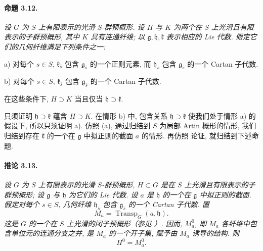 

\paragraph{\textbf{命题 3.12.}}
{\itshape 设 \(G\) 为 \(S\) 上有限表示的光滑 \(S\)-群预概形. 设 \(H\) 与 \(K\) 为两个在 \(S\) 上光滑且有限表示的子群预概形, 其中 \(K\) 具有连通纤维; 以 \(\mathfrak g,\mathfrak h,\mathfrak k\) 表示相应的 Lie 代数. 假定它们的几何纤维满足下列条件之一:

\smallskip
\noindent
\textup{a)}
对每个 \(s\in S\), \(\mathfrak k_{\bar s}\) 包含 \(\mathfrak g_{\bar s}\) 的一个正则元素, 而 \(\mathfrak h_{\bar s}\) 包含 \(\mathfrak g_{\bar s}\) 的一个 Cartan 子代数.

\smallskip
\noindent
\textup{b)}
对每个 \(s\in S\), \(\mathfrak k_{\bar s}\) 包含 \(\mathfrak g_{\bar s}\) 的一个 Cartan 子代数.

\smallskip
\noindent
在这些条件下, \(H\supset K\) 当且仅当 \(\mathfrak h\supset\mathfrak k\).}

只须证明 \(\mathfrak h\supset\mathfrak k\) 蕴含 \(H\supset K\). 在情形 b) 中, 包含关系 \(\mathfrak h\supset\mathfrak k\) 使我们处于情形 a) 的假设下, 所以只须证明 a). 仿照 \textup{(a)}, 通过归结到 \(S\) 为局部 Artin 概形的情形, 我们归结到存在 \(\mathfrak k\) 的一个在 \(\mathfrak g\) 中拟正则的截面 \(a\) 的情形. 再仿照  论证, 就归结到下述命题.

\paragraph{\textbf{推论 3.13.}}
{\itshape 设 \(G\) 为 \(S\) 上有限表示的光滑 \(S\)-群预概形, \(H\subset G\) 是在 \(S\) 上光滑且有限表示的子群预概形; 设 \(\mathfrak g\) 与 \(\mathfrak h\) 为它们的 Lie 代数. 设 \(a\) 是 \(\mathfrak h\) 的一个在 \(\mathfrak g\) 中拟正则的截面. 假定对每个 \(s\in S\), 几何纤维 \(\mathfrak h_{\bar s}\) 包含 \(\mathfrak g_{\bar s}\) 的一个 Cartan 子代数. 置
\[
  M_a=\operatorname{Transp}_G(a,\mathfrak h).
\]
这是 \(G\) 的一个在 \(S\) 上光滑的闭子预概形\textup{（参见 ）}. 因而, \(M_a^0\), 即 \(M_a\) 各纤维中包含单位元的连通分支之并, 是 \(M_a\) 的一个开子集, 赋予由 \(M_a\) 诱导的结构. 则
\[
  H^0=M_a^0.
\]}

